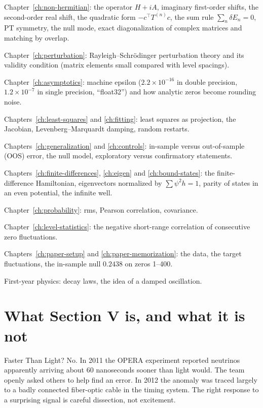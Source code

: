 \begin{prerequisites}
\item Chapter~\ref{ch:non-hermitian}: the operator $H+iA$, imaginary first-order shifts, the second-order real shift, the quadratic form $-c^\top T^{(n)}c$, the sum rule $\sum_n\delta E_n=0$, PT symmetry, the null mode, exact diagonalization of complex matrices and matching by overlap.
\item Chapter~\ref{ch:perturbation}: Rayleigh--Schr\"odinger perturbation theory and its validity condition (matrix elements small compared with level spacings).
\item Chapter~\ref{ch:asymptotics}: machine epsilon ($2.2\times10^{-16}$ in double precision, $1.2\times10^{-7}$ in single precision, ``float32'') and how analytic zeros become rounding noise.
\item Chapters~\ref{ch:least-squares} and \ref{ch:fitting}: least squares as projection, the Jacobian, Levenberg--Marquardt damping, random restarts.
\item Chapters~\ref{ch:generalization} and \ref{ch:controls}: in-sample versus out-of-sample (OOS) error, the null model, exploratory versus confirmatory statements.
\item Chapters~\ref{ch:finite-differences}, \ref{ch:eigen} and \ref{ch:bound-states}: the finite-difference Hamiltonian, eigenvectors normalized by $\sum\psi^2h=1$, parity of states in an even potential, the infinite well.
\item Chapter~\ref{ch:probability}: rms, Pearson correlation, covariance.
\item Chapter~\ref{ch:level-statistics}: the negative short-range correlation of consecutive zero fluctuations.
\item Chapters~\ref{ch:paper-setup} and \ref{ch:paper-memorization}: the data, the target fluctuations, the in-sample null $0.2438$ on zeros 1--400.
\item First-year physics: decay laws, the idea of a damped oscillation.
\end{prerequisites}

\section{What Section V is, and what it is not}\label{sec:paper-spurious-floor-scope}
\begin{didyouknow}{Faster Than Light? No.}
In 2011 the OPERA experiment reported neutrinos apparently arriving about 60 nanoseconds sooner than light would. The team openly asked others to help find an error. In 2012 the anomaly was traced largely to a badly connected fiber-optic cable in the timing system. The right response to a surprising signal is careful dissection, not excitement.
\end{didyouknow}

